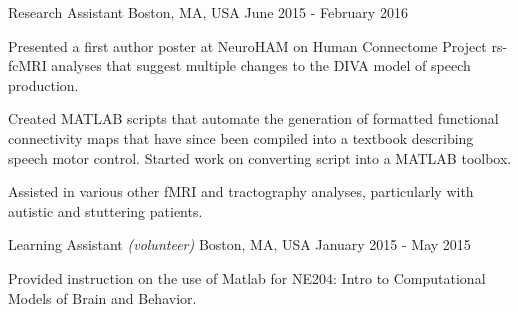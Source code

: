 \begin{cventries}
    {Research Assistant}
    {Boston, MA, USA}
    {June 2015 - February 2016}
    {\begin{cvitems}
        \item{Presented a first author poster at NeuroHAM on Human Connectome Project
            rs-fcMRI analyses that suggest multiple changes to the DIVA model of speech
            production.\vspace*{0.1cm}}
        \item{Created MATLAB scripts that automate the generation of formatted functional
            connectivity maps that have since been compiled into a textbook describing
            speech motor control. Started work on converting script into a MATLAB
            toolbox.\vspace*{0.1cm}}
        \item{Assisted in various other fMRI and tractography analyses, particularly
            with autistic and stuttering patients.}
    \end{cvitems}}
    \vspace*{0.2cm}
    
    {Learning Assistant \textnormal{\small{\textit{(volunteer)}}}}
    {Boston, MA, USA}
    {January 2015 - May 2015}
    {\begin{cvitems}
        \item{Provided instruction on the use of Matlab for NE204: Intro to Computational
            Models of Brain and Behavior.}
    \end{cvitems}}
    \vspace*{0.2cm}
    
\end{cventries}

